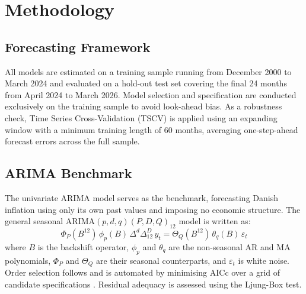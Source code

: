 \chapter{Methodology}\label{sec:methodology}



\section{Forecasting Framework}

All models are estimated on a training sample running from December 2000 to March 2024 and evaluated on a hold-out test set covering the final 24 months from April 2024 to March 2026. Model selection and specification are conducted exclusively on the training sample to avoid look-ahead bias. As a robustness check, Time Series Cross-Validation (TSCV) is applied using an expanding window with a minimum training length of 60 months, averaging one-step-ahead forecast errors across the full sample.


\section{ARIMA Benchmark}

The univariate ARIMA model serves as the benchmark, forecasting Danish inflation using only its own past values and imposing no economic structure. The general seasonal ARIMA$(p,d,q)(P,D,Q)_{12}$ model is written as:
\[
\Phi_P(B^{12})\,\phi_p(B)\,\Delta^d\Delta^D_{12}\,y_t 
= \Theta_Q(B^{12})\,\theta_q(B)\,\varepsilon_t
\]
where $B$ is the backshift operator, $\phi_p$ and $\theta_q$ are the non-seasonal AR and MA polynomials, $\Phi_P$ and $\Theta_Q$ are their seasonal counterparts, and $\varepsilon_t$ is white noise. Order selection follows \textcite{box_jenkins_1976} and is automated by minimising AICc over a grid of candidate specifications \parencite{hyndman_athanasopoulos_2021}. Residual adequacy is assessed using the Ljung-Box test.






